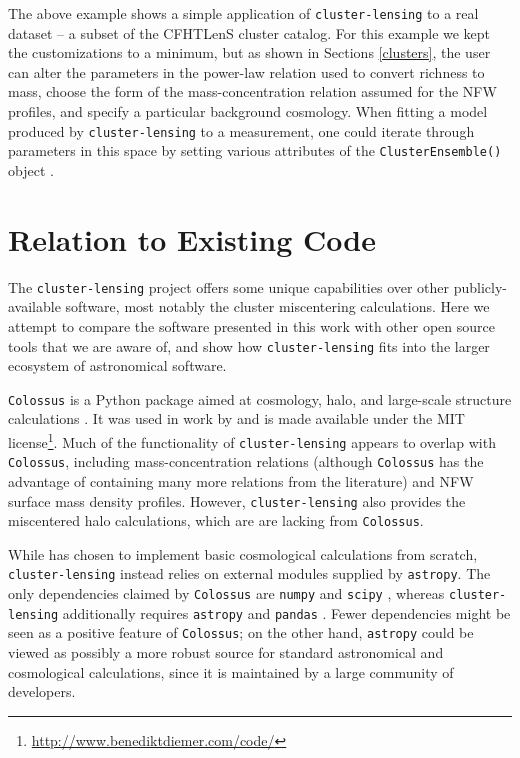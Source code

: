 \documentclass[twocolumn]{aastex6}
\newcommand{\code}{\lstinline[style=codeintext]}
\begin{document}
The above example shows a simple application of \code{cluster-lensing} to a real dataset -- a subset of the CFHTLenS cluster catalog.  For this example we kept the customizations to a minimum, but as shown in Sections \ref{clusters}, the user can alter the parameters in the power-law relation used to convert richness to mass, choose the form of the mass-concentration relation assumed for the NFW profiles, and specify a particular background cosmology. When fitting a model produced by \code{cluster-lensing} to a measurement, one could iterate through parameters in this space by setting various attributes of the \code{ClusterEnsemble()} object \citep[as done, e.g. in][]{Ford14, Ford15}.


\section{Relation to Existing Code}

The \code{cluster-lensing} project offers some unique capabilities over other publicly-available software, most notably the cluster miscentering calculations. Here we attempt to compare the software presented in this work with other open source tools that we are aware of, and show how \code{cluster-lensing} fits into the larger ecosystem of astronomical software.

\code{Colossus} is a Python package aimed at cosmology, halo, and large-scale structure calculations \citep{ColossusCode}. It was used in work by \citet{Diemer15} and is made available under the MIT license\footnote{\url{http://www.benediktdiemer.com/code/}}. Much of the functionality of \code{cluster-lensing} appears to overlap with \code{Colossus}, including mass-concentration relations (although \code{Colossus} has the advantage of containing many more relations from the literature) and NFW surface mass density profiles. However, \code{cluster-lensing} also provides the miscentered halo calculations, which are are lacking from \code{Colossus}.

While \citet{ColossusCode} has chosen to implement basic cosmological calculations from scratch, \code{cluster-lensing} instead relies on external modules supplied by \code{astropy}.  The only dependencies claimed by \code{Colossus} are \code{numpy} \citep{NumPy} and \code{scipy} \citep{SciPy}, whereas \code{cluster-lensing} additionally requires \code{astropy} \citep{astropy13} and \code{pandas} \citep{Pandas}. Fewer dependencies might be seen as a positive feature of \code{Colossus}; on the other hand, \code{astropy} could be viewed as possibly a more robust source for standard astronomical and cosmological calculations, since it is maintained by a large community of developers.
\end{document}
